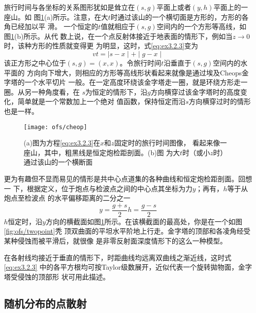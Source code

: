 旅行时间与各坐标的关系图形犹如是耸立在$(s,g)$平面上或者$(y,h)$平面上的一座山。如
图\ref{fig:ofs/cheop}(a)所示。注意，在大$t$时通过该山的一个横切面是方形的，方形的各角已经加以平
滑。 一个恒定的$t$值就相应于$(s,g)$空间内的一个方形等高线，如图\ref{fig:ofs/cheop}(b)所示。从代
数上说，在一个点反射体接近于地表面的情形下，例如当$z\rightarrow 0$时，该种方形的性质就变得更
为明显，这时，式\ref{eq:ex3.2.3}变为
\begin{equation}
vt=\mid s-x \mid + \mid g-x\mid
\label{eq:ex3.2.4}
\end{equation}
该正方形之中心位于$(s,g)=(x,x)$。令旅行时间$t$沿垂直于$(s,g)$空间内的水平面的
方向向下增大，则相应的方形等高线形状看起来就像是通过埃及Cheops金字塔的一个水平切片
一般。在一定高度环绕该金字塔走一圈，就是环绕方形走一圈。从另一种角度看，在
$s$为恒定的情形下，沿$g$方向横穿过该金字塔时的高度变化，简单就是一个常数加上一个绝对
值函数，保持恒定而沿$s$方向横穿过时的情形也是一样。
\begin{figure}[H]
\centering
\texttt{[image: ofs/cheop]}
\caption[cheop]{(a)图为方程\ref{eq:ex3.2.3}在$x$和$z$固定时的旅行时间图像，
看起来像一座山，其中，粗黑线是恒定炮检距剖面。(b)图
为大$t$时（或小$z$时）通过该山的一个横断面}
\label{fig:ofs/cheop}
\end{figure}
更为有趣但不显而易见的情形是共中心点道集的各种曲线和恒定炮检距剖面。回想一
下，根据定义，位于炮点与检波点之间的中心点其坐标为力$y$；再有，$h$等于从炮点至检波点
的水平偏移距离的二分之一
\begin{subequations}
\begin{equation}
y=\frac{g+s}{2}
\label{eq:ex3.2.5a}
\end{equation}
\begin{equation}
h=\frac{g-s}{2}
\label{eq:ex3.2.5b}
\end{equation}
\label{eq:ex3.2.5}
\end{subequations}
$h$恒定时，沿$y$方向的横截面如图\ref{fig:ofs/cheop}所示。在该横截面的最高处，你是在一个如图\ref{fig:ofs/twopoint}秃
顶双曲面的平坦水平阶地上行走。金字塔的顶部和各凌角经受某种侵蚀而被平滑后，就很像
是非零反射面深度情形下的这么一种模型。

在各射线均接近于垂直的情形下，时距曲线均远离双曲线之渐近线，这时式\ref{eq:ex3.2.3}
中的各平方根均可按Taylor级数展开，近似代表一个旋转拋物面，金字塔受侵蚀的顶部形
状可用此描述。

\subsection{随机分布的点散射}
\label{sec:3.2.5}

